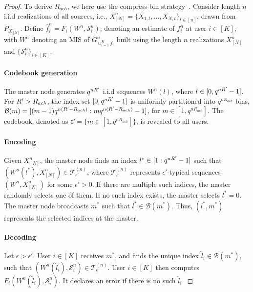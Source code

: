 \documentclass[conference, letterpaper]{IEEEtran} %
\begin{document}
\begin{proof}
\label{proof-Theorem-upper-and-lower} 
To derive $R_{ach}$, we here use the compress-bin strategy~\cite[Theorem 11.3]{el2011network}. %
Consider length $n$ i.i.d realizations of all sources, i.e., $X_{[N]}^{n}=\{X_{1,t},\dots,X_{N,t}\}_{t\in [n]}$, drawn from $P_{X_{[N]}}$. 
Define $\hat{f}_{i}^{n}=F_i(W^n, \mathcal{S}_{i}^{n})$, denoting an estimate of $f_{i}^{n}$ at user $i\in [K]$, %
with $W^n$ denoting an MIS of $G^n_{\cup_{i=1}^{K} f_i}$ built using the length $n$ realizations $X_{[N]}^{n}$ and $\{\mathcal{S}_{i}^{n}\}_{i\in[K]}$. 





\paragraph{Codebook generation}  
The master node generates $q^{nR'}$ i.i.d sequences $W^{n}(l)$, where $l \in [0, q^{nR'} - 1]$. For $R'>R_{ach}$, the index set $[0, q^{nR'}-1]$ is uniformly partitioned into $q^{nR_{ach}}$ bins, $\mathcal{B}(m)=[(m-1)q^{n(R'-R_{ach})}: mq^{n(R'-R_{ach})}-1]$, for $m\in [1, q^{nR_{ach}}]$. The codebook, denoted as $\mathcal{C}=\{m\in [1,q^{nR_{ach}}]\}$, is revealed to all users.


\paragraph{Encoding}
Given $X_{[N]}^{n}$, the master node finds an index $l^*\in [1:q^{nR'}-1]$ such that $(W^{n}(l^*),X^{n}_{[N]})\in \mathcal{T}_{\epsilon'}^{(n)}$, where $\mathcal{T}_{\epsilon'}^{(n)}$ represents $\epsilon'$-typical sequences $(W^n, X^{n}_{[N]})$ for some $\epsilon'>0$. 
If there are multiple such indices, the master randomly selects one of them. If no such index exists, the master selects $l^*=0$. The master node broadcasts $m^*$ such that $l^*\in \mathcal{B}(m^*)$. 
Thus, $(l^*, m^*)$ represents the selected indices at the master.


\paragraph{Decoding}
Let $\epsilon>\epsilon'$. User $i\in [K]$ receives $m^*$, and finds the unique index $\hat{l}_i \in \mathcal{B}(m^*)$, such that $(W^{n}(\hat{l}_i),\mathcal{S}_{i}^{n})\in \mathcal{T}_{\epsilon}^{(n)}$. User $i\in [K]$ then computes $F_i(W^n(\hat{l}_i), \mathcal{S}_{i}^{n})$. %
It declares an error if there is no such $\hat{l}_i$.%




\end{proof}
\end{document}
